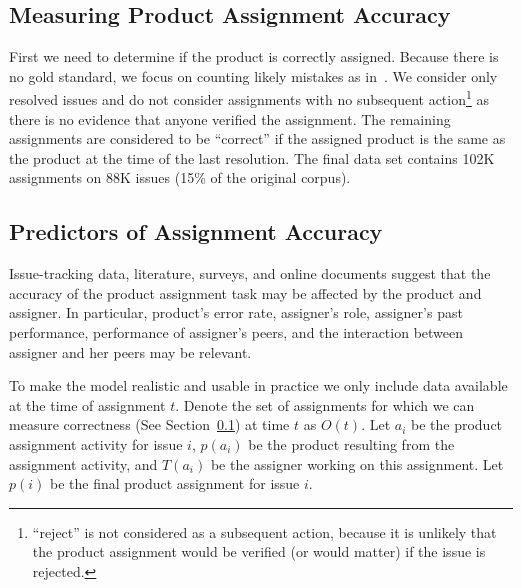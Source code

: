 \documentclass{sig-alternate}
\begin{document}

\subsection{Measuring Product Assignment Accuracy}\label{ss:measureaccuracy}
First we need to determine if the product is correctly assigned.
Because there is no gold standard, we focus on
counting likely mistakes as in~\cite{XZM13}. We
consider only resolved issues and do not consider assignments with
no subsequent action\footnote{``reject'' is not
  considered as a subsequent action, because it is unlikely that
  the product assignment would be verified (or would matter) if the
  issue is rejected.} as there is no evidence
that anyone verified the assignment. The remaining assignments are
considered to be ``correct'' if the assigned product is the same as
the product at the time of the last resolution. The final data set
contains 102K assignments on 88K issues (15\% of the original corpus).


\subsection{Predictors of Assignment Accuracy}\label{ss:predictors}

Issue-tracking data, literature, surveys, and online documents suggest
that the accuracy of the product assignment task may be affected
by the product and assigner.
In particular, product's error rate, assigner's role, assigner's past performance,
performance of assigner's peers, and the interaction between assigner and
her peers may be relevant.

To make the model realistic and usable in practice we only include
data available at the time of assignment $t$.  Denote the set of
assignments for which we can measure correctness (See
Section~\ref{ss:measureaccuracy}) at time $t$ as
$O(t)$. Let $a_i$ be the product assignment activity for issue
$i$, $p(a_i)$ be the product resulting from the assignment
activity, and $T(a_i)$ be the assigner working on this
assignment. Let $p(i)$ be the final product assignment for issue $i$.
\end{document}
